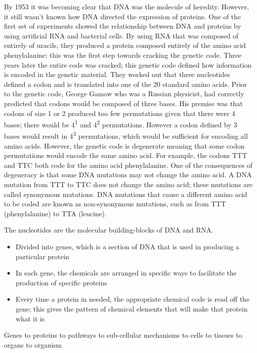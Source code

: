 By 1953 it was becoming clear that DNA was the molecule of heredity. However, it still wasn't known how DNA directed the expression of proteins. One of the first set of experiments showed the relationship between DNA and proteins by using artificial RNA and bacterial cells\cite{pmid14471390}. By using RNA that was composed of entirely of uracils, they produced a protein composed entirely of the amino acid phenylalanine; this was the first step towards cracking the genetic code. Three years later the entire code was cracked\cite{pmid5330357}; this genetic code defined how information is encoded in the genetic material. They worked out that three nucleotides defined a codon and is translated into one of the 20 standard amino acids. Prior to the genetic code, George Gamow who was a Russian physicist, had correctly predicted that codons would be composed of three bases. His premise was that codons of size 1 or 2 produced too few permutations given that there were 4 bases; there would be 4\textsuperscript{1} and 4\textsuperscript{2} permutations. However a codon defined by 3 bases would result in 4\textsuperscript{3} permutations, which would be sufficient for encoding all amino acids. However, the genetic code is degenerate meaning that some codon permutations would encode the same amino acid. For example, the codons TTT and TTC both code for the amino acid phenylalanine. One of the consequences of degeneracy is that some DNA mutations may not change the amino acid. A DNA mutation from TTT to TTC does not change the amino acid; these mutations are called synonymous mutations. DNA mutations that cause a different amino acid to be coded are known as non-synonymous mutations, such as from TTT (phenylalanine) to TTA (leucine).

The nucleotides are the molecular building-blocks of DNA and RNA.

\begin{itemize}
   \item Divided into genes, which is a section of DNA that is used in producing a particular protein
   \item In each gene, the chemicals are arranged in specific ways to facilitate the production of specific proteins
   \item Every time a protein in needed, the appropriate chemical code is read off the gene; this gives the pattern of chemical elements that will make that protein what it is
\end{itemize}

Genes to proteins to pathways to sub-cellular mechanisms to cells to tissues to organs to organism

